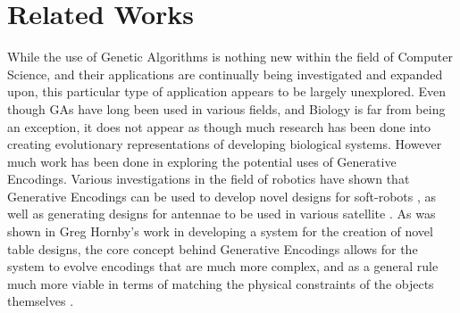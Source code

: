 \documentclass[condensed]{union-cs-thesis}
\begin{document}
\section{Related Works}
\label{sec:relatedworks}
\par
While the use of Genetic Algorithms is nothing new within the field of Computer Science, and their
applications are continually being investigated and expanded upon, this particular type of application
appears to be largely unexplored.  Even though GAs have long been used in various fields, and Biology
is far from being an exception, it does not appear as though much research has been done into
creating evolutionary representations of developing biological systems.  However much work has been
done in exploring the potential uses of Generative Encodings.  Various investigations in the field of
robotics have shown that Generative Encodings can be used to develop novel designs for soft-robots
\cite{rieffel2009automated},
as well as generating designs for antennae to be used in various satellite
\cite{lohn2005evolved}.
As was shown in Greg Hornby's work in developing a system for the creation of novel table designs, the
core concept behind Generative Encodings allows for the system to evolve encodings that are much more
complex, and as a general rule much more viable in terms of matching the physical constraints of the
objects themselves
\cite{hornby2004functional,hornby2001advantages}.

\end{document}

